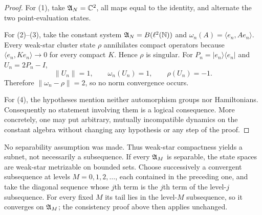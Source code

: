 \documentclass[11pt,a4paper]{article}
\begin{document}
\begin{proof}
For (1), take \(\mathfrak A_N=\mathbb C^2\), all maps equal to the identity, and alternate the two
point-evaluation states.

For (2)--(3), take the constant system \(\mathfrak A_N=B(\ell^2(\mathbb N))\) and
\(\omega_n(A)=\langle e_n,Ae_n\rangle\).  Every weak-star cluster state \(\rho\)
annihilates compact operators because
\(\langle e_n,Ke_n\rangle\to0\) for every compact \(K\).  Hence \(\rho\) is
singular.  For \(P_n=|e_n\rangle\langle e_n|\) and
\(U_n=2P_n-I\),
\[
 \|U_n\|=1,\qquad \omega_n(U_n)=1,\qquad \rho(U_n)=-1.          \tag{5.1}
\]
Therefore \(\|\omega_n-\rho\|=2\), so no norm convergence occurs.

For (4), the hypotheses mention neither automorphism groups nor Hamiltonians.
Consequently no statement involving them is a logical consequence.  More concretely,
one may put arbitrary, mutually incompatible dynamics on the constant algebra without
changing any hypothesis or any step of the proof.
\end{proof}

\begin{remark}
No separability assumption was made.  Thus weak-star compactness yields a subnet, not
necessarily a subsequence.  If every \(\mathfrak A_M\) is separable, the state spaces are
weak-star metrizable on bounded sets.  Choose successively a convergent subsequence
at levels $M=0,1,2,\ldots$, each contained in the preceding one, and take the
diagonal sequence whose $j$th term is the $j$th term of the level-$j$ subsequence.
For every fixed $M$ its tail lies in the level-$M$ subsequence, so it converges on
$\mathfrak A_M$; the consistency proof above then applies unchanged.
\end{remark}
\end{document}
